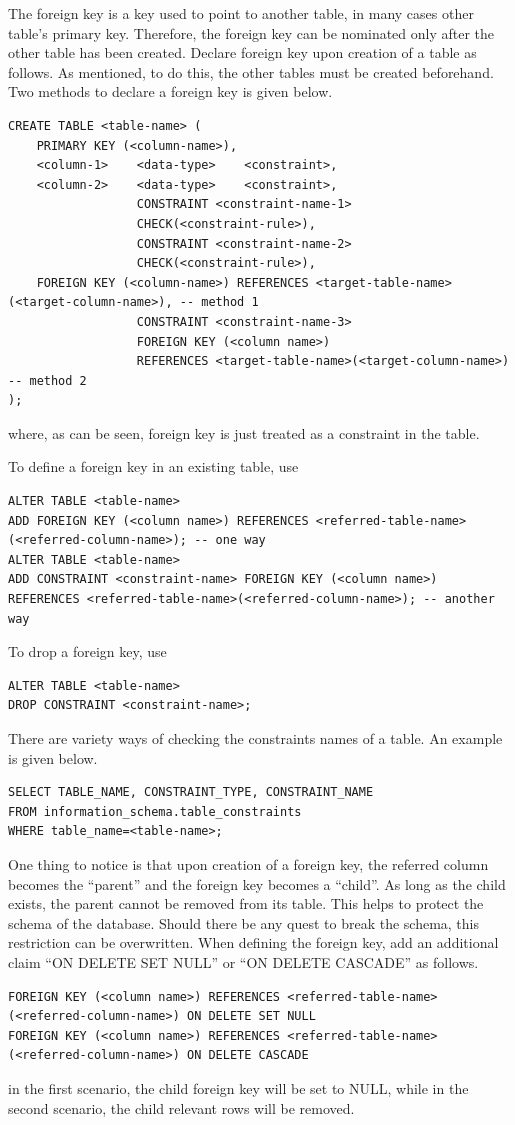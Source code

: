 The foreign key is a key used to point to another table, in many cases other table's primary key. Therefore, the foreign key can be nominated only after the other table has been created. Declare foreign key upon creation of a table as follows. As mentioned, to do this, the other tables must be created beforehand. Two methods to declare a foreign key is given below.
\begin{lstlisting}
CREATE TABLE <table-name> (
    PRIMARY KEY (<column-name>),
    <column-1>    <data-type>    <constraint>,
    <column-2>    <data-type>    <constraint>,
                  CONSTRAINT <constraint-name-1>
                  CHECK(<constraint-rule>),
                  CONSTRAINT <constraint-name-2>
                  CHECK(<constraint-rule>),
    FOREIGN KEY (<column-name>) REFERENCES <target-table-name>(<target-column-name>), -- method 1
                  CONSTRAINT <constraint-name-3>
                  FOREIGN KEY (<column name>)
                  REFERENCES <target-table-name>(<target-column-name>) -- method 2
);
\end{lstlisting}
where, as can be seen, foreign key is just treated as a constraint in the table.

To define a foreign key in an existing table, use
\begin{lstlisting}
ALTER TABLE <table-name>
ADD FOREIGN KEY (<column name>) REFERENCES <referred-table-name>(<referred-column-name>); -- one way
ALTER TABLE <table-name>
ADD CONSTRAINT <constraint-name> FOREIGN KEY (<column name>) REFERENCES <referred-table-name>(<referred-column-name>); -- another way
\end{lstlisting}
To drop a foreign key, use
\begin{lstlisting}
ALTER TABLE <table-name>
DROP CONSTRAINT <constraint-name>;
\end{lstlisting}

There are variety ways of checking the constraints names of a table. An example is given below.
\begin{lstlisting}
SELECT TABLE_NAME, CONSTRAINT_TYPE, CONSTRAINT_NAME
FROM information_schema.table_constraints
WHERE table_name=<table-name>;
\end{lstlisting}

One thing to notice is that upon creation of a foreign key, the referred column becomes the ``parent'' and the foreign key becomes a ``child''. As long as the child exists, the parent cannot be removed from its table. This helps to protect the schema of the database. Should there be any quest to break the schema, this restriction can be overwritten. When defining the foreign key, add an additional claim ``ON DELETE SET NULL'' or ``ON DELETE CASCADE'' as follows.
\begin{lstlisting}
FOREIGN KEY (<column name>) REFERENCES <referred-table-name>(<referred-column-name>) ON DELETE SET NULL
FOREIGN KEY (<column name>) REFERENCES <referred-table-name>(<referred-column-name>) ON DELETE CASCADE
\end{lstlisting}
in the first scenario, the child foreign key will be set to NULL, while in the second scenario, the child relevant rows will be removed.

